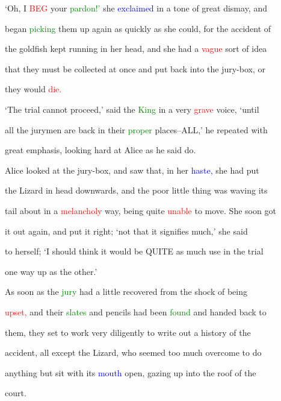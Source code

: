  ‘Oh, I \textcolor{red}{BEG} your \textcolor{green}{pardon!’} she \textcolor{blue}{exclaimed} in a tone of great \textcolor{BurntOrange}{dismay,} and

 began \textcolor{green}{picking} them up again as quickly as she could, for the \textcolor{BurntOrange}{accident} of

 the goldfish kept running in her head, and she had a \textcolor{red}{vague} sort of idea

 that they must be collected at once and put back into the jury-box, or

 they would \textcolor{red}{die.}



 ‘The trial cannot proceed,’ said the \textcolor{green}{King} in a very \textcolor{red}{grave} voice, ‘until

 all the jurymen are back in their \textcolor{green}{proper} places--ALL,’ he repeated with

 great emphasis, looking hard at Alice as he said do.



 Alice looked at the jury-box, and saw that, in her \textcolor{blue}{haste,} she had put

 the Lizard in head downwards, and the poor little thing was waving its

 tail about in a \textcolor{red}{melancholy} way, being quite \textcolor{red}{unable} to move. She soon got

 it out again, and put it right; ‘not that it signifies much,’ she said

 to herself; ‘I should think it would be QUITE as much use in the trial

 one way up as the other.’



 As soon as the \textcolor{green}{jury} had a little recovered from the \textcolor{BurntOrange}{shock} of being

 \textcolor{red}{upset,} and their \textcolor{green}{slates} and pencils had been \textcolor{green}{found} and handed back to

 them, they set to work very diligently to write out a history of the

 \textcolor{BurntOrange}{accident,} all except the Lizard, who seemed too much overcome to do

 anything but sit with its \textcolor{blue}{mouth} open, gazing up into the roof of the

 \textcolor{BurntOrange}{court.}



